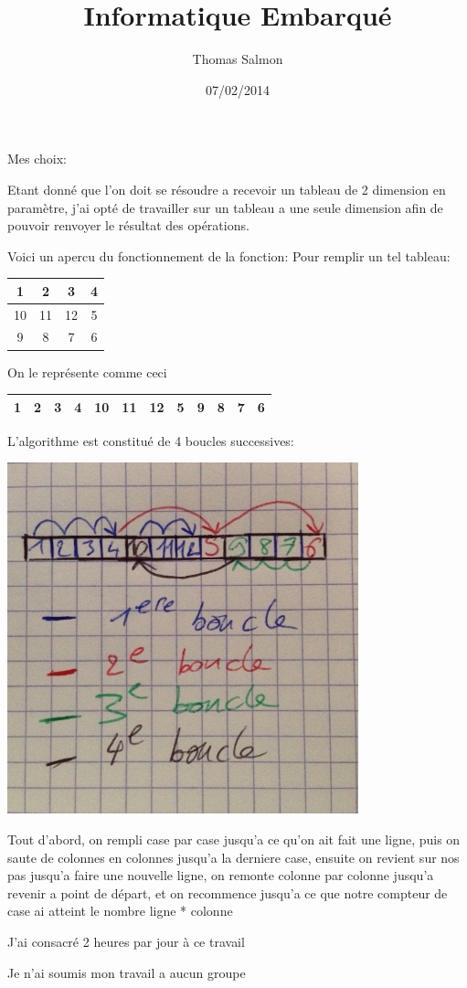 \documentclass[a4paper]{article}
\title{Informatique Embarqué}
\author{Thomas Salmon}
\date{07/02/2014}
\begin{document}
Mes choix:

Etant donné que l'on doit se résoudre a recevoir un tableau de 2 dimension en paramètre, j'ai opté de travailler sur un tableau a une seule dimension afin de pouvoir renvoyer le résultat des opérations.

Voici un apercu du fonctionnement de la fonction:
Pour remplir un tel tableau:

\begin{tabular}{|*{4}{c|}}
    \hline
     1  & 2  & 3  & 4 \\
    \hline
     10 & 11 & 12 & 5 \\
    \hline
     9  & 8  & 7  & 6\\
    \hline
\end{tabular}

On le représente comme ceci

\begin{tabular}{|*{12}{c|}}
    \hline
     1  & 2  & 3  & 4 & 10 & 11 & 12 & 5 & 9  & 8  & 7  & 6\\
    \hline
\end{tabular}

L'algorithme est constitué de 4 boucles successives:

\includegraphics[width=4in]{algo}

Tout d'abord, on rempli case par case jusqu'a ce qu'on ait fait une ligne, puis on saute de colonnes en colonnes jusqu'a la derniere case, ensuite on revient sur nos pas jusqu'a faire une nouvelle ligne, on remonte colonne par colonne jusqu'a revenir a point de départ, et on recommence jusqu'a ce que notre compteur de case ai atteint le nombre ligne * colonne

J'ai consacré 2 heures par jour à ce travail

Je n'ai soumis mon travail a aucun groupe
\end{document}

